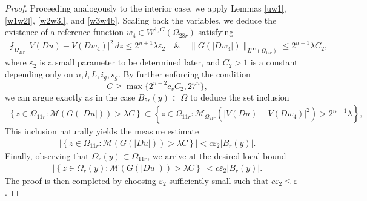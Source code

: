 \documentclass[10pt,a4paper]{amsart}
\begin{document}
\begin{proof}
 	Proceeding analogously to the interior case, we apply Lemmas \ref{uw1}, \ref{w1w2l}, \ref{w2w3l}, and \ref{w3w4b}. Scaling back the variables, we deduce the existence of a reference function $w_4 \in W^{1,G}(\Omega_{28r})$ satisfying
 	\begin{align*}
 		\fint_{\Omega_{21r}}
 		|V(Du)-V(Dw_4)|^2\,dz
 		 \leq 2^{n+1}\lambda \varepsilon_2 \quad \& \quad  \|G(|Dw_4|)\|_{L^\infty(\Omega_{14r})}
 		 \leq
 		2^{n+1}\lambda C_2 ,
 	\end{align*}
 where $\varepsilon_2$ is a small parameter to be determined later, and $C_2 > 1$ is a constant depending only on $n, l, L, i_g, s_g$.
 By further enforcing the condition
 	\[
 C\geq \max\{2^{n+2}c_vC_2,27^n\},
 	\]
 	we can argue exactly as in the case $B_{5r}(y) \subset \Omega$ to deduce the set inclusion
 	\begin{align*}
 		\left\{
 		z\in\Omega_{11r}:
 		\mathcal{M}(G(|Du|))>\lambda C
 		\right\}
 		\subset
 		\left\{
 		z\in\Omega_{11r}:
 		\mathcal{M}_{\Omega_{21r}}
 		\left(
 		|V(Du)-V(Dw_4)|^2
 		\right)
 		>2^{n+1}\lambda
 		\right\},
 	\end{align*}
This inclusion naturally yields the measure estimate
 	\begin{align*}
 		\left|
 		\left\{
 		z\in\Omega_{11r}:
 		\mathcal{M}(G(|Du|))>\lambda C
 		\right\}
 		\right|
 		<
 		c\varepsilon_2|B_r(y)|.
 	\end{align*}
 	Finally, observing that $\Omega_r(y) \subset \Omega_{11r}$, we arrive at the desired local bound
 	\begin{align*}
 		\left|
 		\left\{
 		z\in\Omega_r(y):
 		\mathcal{M}(G(|Du|))>\lambda C
 		\right\}
 		\right|
 		<
 		c\varepsilon_2|B_r(y)|.
 	\end{align*}
 The proof is then completed by choosing $\varepsilon_2$ sufficiently small such that $c\varepsilon_2 \leq \varepsilon$.
 \end{proof}
\end{document}
